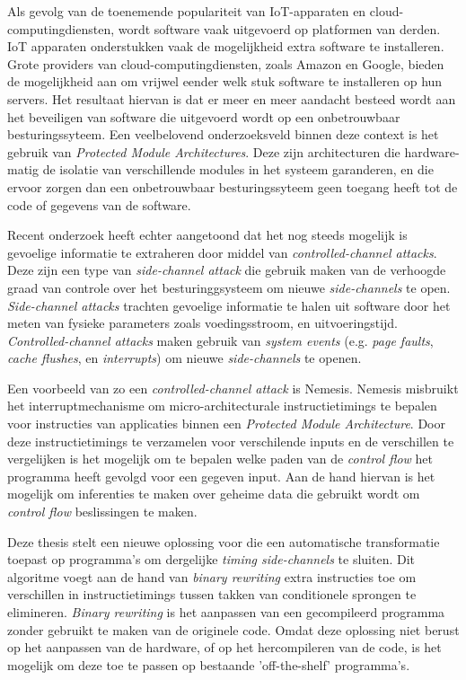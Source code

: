 \documentclass[master=cws,masteroption=ai, english]{kulemt}
\begin{document}
\begin{abstract*}
Als gevolg van de toenemende populariteit van IoT-apparaten en cloud-computingdiensten, wordt software vaak uitgevoerd op platformen van derden. 
IoT apparaten onderstukken vaak de mogelijkheid extra software te installeren. Grote providers van cloud-computingdiensten, zoals Amazon en Google, bieden de mogelijkheid aan 
om vrijwel eender welk stuk software te installeren op hun servers. 
Het resultaat hiervan is dat er meer en meer aandacht besteed wordt aan het beveiligen van software die uitgevoerd wordt op een onbetrouwbaar besturingssyteem. 
Een veelbelovend onderzoeksveld binnen deze context is het gebruik van \textit{Protected Module Architectures}. 
Deze zijn architecturen die hardware-matig de isolatie van verschillende modules in het systeem garanderen, en die ervoor zorgen dan een onbetrouwbaar besturingssyteem geen toegang
heeft tot de code of gegevens van de software. 

Recent onderzoek heeft echter aangetoond dat het nog steeds mogelijk is gevoelige informatie te extraheren door middel van \textit{controlled-channel attacks}. 
Deze zijn een type van \textit{side-channel attack} die gebruik maken van de verhoogde graad van controle over het besturinggsysteem om nieuwe \textit{side-channels} te open. 
\textit{Side-channel attacks} trachten gevoelige informatie te halen uit software door het meten van fysieke parameters zoals voedingsstroom, en uitvoeringstijd. 
\textit{Controlled-channel attacks} maken gebruik van \textit{system events} (e.g. \textit{page faults}, \textit{cache flushes}, en \textit{interrupts}) om nieuwe 
\textit{side-channels} te openen. 

Een voorbeeld van zo een \textit{controlled-channel attack} is Nemesis. Nemesis misbruikt het interruptmechanisme om micro-architecturale instructietimings te bepalen voor
instructies van applicaties binnen een \textit{Protected Module Architecture}. Door deze instructietimings te verzamelen voor verschilende inputs en de verschillen te vergelijken
is het mogelijk om te bepalen welke paden van de \textit{control flow} het programma heeft gevolgd voor een gegeven input. 
Aan de hand hiervan is het mogelijk om inferenties te maken over geheime data die gebruikt wordt om \textit{control flow} beslissingen te maken. 

Deze thesis stelt een nieuwe oplossing voor die een automatische transformatie toepast op programma's om dergelijke \textit{timing side-channels} te sluiten. 
Dit algoritme voegt aan de hand van \textit{binary rewriting} extra instructies toe om verschillen in instructietimings tussen takken van conditionele sprongen te elimineren. 
\textit{Binary rewriting} is het aanpassen van een gecompileerd programma zonder gebruikt te maken van de originele code. 
Omdat deze oplossing niet berust op het aanpassen van de hardware, of op het hercompileren van de code, is het mogelijk om deze toe te passen op bestaande 'off-the-shelf' programma's. 


\end{abstract*}
\end{document}
